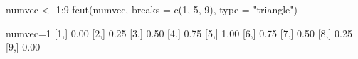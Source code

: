 \begin{Schunk}
% --begin: "fcut.numeric1"
\begin{Sinput}
 numvec <- 1:9
 fcut(numvec, breaks = c(1, 5, 9), type = "triangle")
\end{Sinput}
\begin{Soutput}
      numvec=1
 [1,]     0.00
 [2,]     0.25
 [3,]     0.50
 [4,]     0.75
 [5,]     1.00
 [6,]     0.75
 [7,]     0.50
 [8,]     0.25
 [9,]     0.00
\end{Soutput}
%
% --end: "fcut.numeric1"
\end{Schunk}
